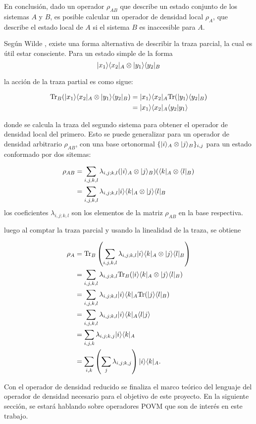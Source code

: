 En conclusión, dado un operador $\rho_{AB}$ que describe un estado conjunto de los sistemas $A$ y $B$, es posible calcular un operador de densidad local $\rho_A$, que describe el estado local de $A$ si el sistema $B$ es inaccesible para $A$.


Según Wilde {\cite{wilde2011classical}}, existe una forma alternativa de describir la traza parcial, la cual es útil estar consciente. Para un estado simple de la forma 
\begin{equation}
	|x_1\rangle \langle x_2|_A\otimes|y_1\rangle \langle y_2|_B
\end{equation}

la acción de la traza partial es como sigue:

\begin{equation}
	\begin{split}
	{\rm Tr}_B(	|x_1\rangle \langle x_2|_A\otimes|y_1\rangle \langle y_2|_B)&=|x_1\rangle \langle x_2|_A{\rm Tr}(|y_1\rangle \langle y_2|_B)\\
	&=|x_1\rangle \langle x_2|_A \langle y_2|y_1\rangle
	\end{split}
\end{equation}

donde se calcula la traza del segundo sistema para obtener el operador de densidad local del primero. Esto se puede generalizar para un operador de densidad arbitrario $\rho_{AB}$, con una base ortonormal $\{|i \rangle_A \otimes |j\rangle_B \} _{i,j}$ para un estado conformado por dos sitemas:


\begin{equation}
	\begin{split}
	\rho_{AB}&=\sum_{i,j,k,l}\lambda_{i,j;k,l}(|i\rangle_A \otimes|j\rangle_B)(\langle k|_A\otimes \langle l|_B)\\
	&=\sum_{i,j,k,l}\lambda_{i,j;k,l} |i\rangle \langle k|_A\otimes|j\rangle \langle l|_B
	\end{split}
\end{equation}
los coeficientes $\lambda_{i,j;k,l}$  son los elementos de la matriz $\rho_{AB}$ en la base respectiva.


luego al comptar la traza parcial y usando la linealidad de la traza, se obtiene


\begin{equation}
	\begin{split}
		\rho_A&={\rm Tr}_B\left(\sum_{i,j,k,l}\lambda_{i,j;k,l} |i\rangle \langle k|_A\otimes|j\rangle \langle l|_B\right)\\
		&=\sum_{i,j,k,l}\lambda_{i,j;k,l} {\rm Tr}_B(|i\rangle \langle k|_A\otimes|j\rangle \langle l|_B)\\
		&=\sum_{i,j,k,l}\lambda_{i,j;k,l}|i\rangle \langle k|_A {\rm Tr}(|j\rangle \langle l|_B)\\
		&=\sum_{i,j,k,l}\lambda_{i,j;k,l}|i\rangle \langle k|_A \langle l|j\rangle \\
		&=\sum_{i,j,k}\lambda_{i,j;k,j}|i\rangle \langle k|_A\\
		&=\sum_{i,k}\left(\sum_j\lambda_{i,j;k,j}\right)|i\rangle \langle k|_A.
	\end{split}
\end{equation}



Con el operador de densidad reducido se finaliza el marco teórico del lenguaje del operador de densidad necesario para el objetivo de este proyecto. En la siguiente sección, se estará hablando sobre operadores POVM que son de interés en este trabajo.



